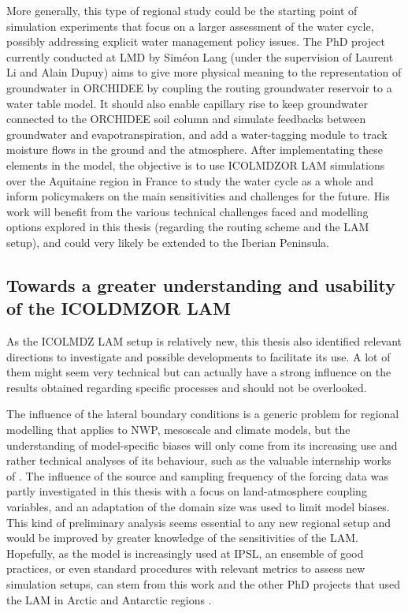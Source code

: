 \hfill

More generally, this type of regional study could be the starting point of simulation experiments that focus on a larger assessment of the water cycle, possibly addressing explicit water management policy issues.
The PhD project currently conducted at LMD by Siméon Lang (under the supervision of Laurent Li and Alain Dupuy) aims to give more physical meaning to the representation of groundwater in ORCHIDEE by coupling the routing groundwater reservoir to a water table model. It should also enable capillary rise to keep groundwater connected to the ORCHIDEE soil column and simulate feedbacks between groundwater and evapotranspiration, and add a water-tagging module to track moisture flows in the ground and the atmosphere.
After implementating these elements in the model, the objective is to use ICOLMDZOR LAM simulations over the Aquitaine region in France to study the water cycle as a whole and inform policymakers on the main sensitivities and challenges for the future.
His work will benefit from the various technical challenges faced and modelling options explored in this thesis (regarding the \native routing scheme and the LAM setup), and could very likely be extended to the Iberian Peninsula.

\subsection{Towards a greater understanding and usability of the ICOLDMZOR LAM}

As the ICOLMDZ LAM setup is relatively new, this thesis also identified relevant directions to investigate and possible developments to facilitate its use. 
A lot of them might seem very technical but can actually have a strong influence on the results obtained regarding specific processes and should not be overlooked.

The influence of the lateral boundary conditions is a generic problem for regional modelling that applies to NWP, mesoscale and climate models, but the understanding of model-specific biases will only come from its increasing use and rather technical analyses of its behaviour, such as the valuable internship works of \citet{conesa2022, maiga2025}.
The influence of the source and sampling frequency of the forcing data was partly investigated in this thesis with a focus on land-atmosphere coupling variables, and an adaptation of the domain size was used to limit model biases. 
This kind of preliminary analysis seems essential to any new regional setup and would be improved by greater knowledge of the sensitivities of the LAM.
Hopefully, as the model is increasingly used at IPSL, an ensemble of good practices, or even standard procedures with relevant metrics to assess new simulation setups, can stem from this work and the other PhD projects that used the LAM in Arctic and Antarctic regions \citep{raillard2025,wiener2025}.

